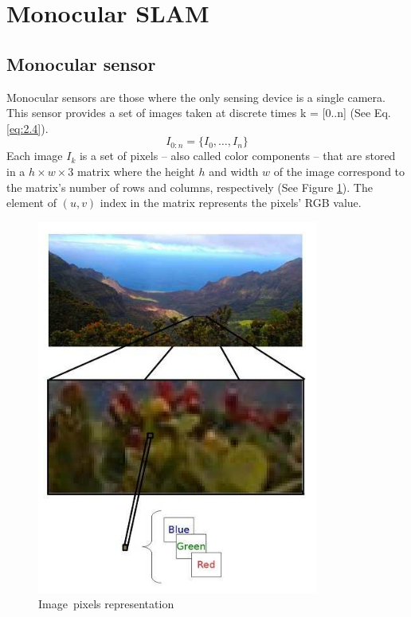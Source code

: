 \documentclass[11pt,openany]{book}
\begin{document}
\section{Monocular SLAM}
\subsection{Monocular sensor}
Monocular sensors are those where the only sensing device is a single camera. This sensor provides a set of images taken at discrete times k = [0..n] (See Eq.\ref{eq:2.4}).
\begin{equation} \label{eq:2.4}
    I_{0:n}=\{I_0,\dots,I_n\}
\end{equation}
Each image $I_k$ is a set of pixels – also called color components – that are stored in a $h \times w \times 3 $ matrix where the height $h$ and width $w$ of the image correspond to the matrix’s number of rows and columns, respectively (See Figure \ref{fig:2.9}). The element of $(u, v)$ index in the matrix represents the pixels’ RGB value.
\begin{figure}[H]
    \centering
    \includegraphics[scale=0.6]{assets/2_9.png}
    \caption{{Image\protect\footnotemark ~pixels representation}}
    \label{fig:2.9}
\end{figure}
\end{document}
